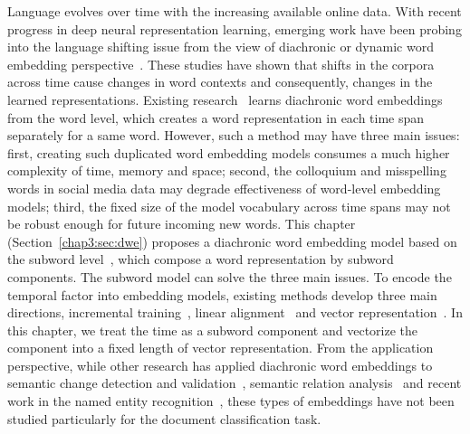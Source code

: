Language evolves over time with the increasing available online data. 
With recent progress in deep neural representation learning, emerging work have been probing into the language shifting issue from the view of diachronic or dynamic word embedding perspective~\cite{tang2018state, kutuzov2018diachronic}.
These studies have shown that shifts in the corpora across time cause changes in word contexts and consequently, changes in the learned representations. 
Existing research~\cite{kim2014temporal, hamilton2016diachronic, yao2018dynamic, kutuzov2018diachronic} learns diachronic word embeddings from the word level, which creates a word representation in each time span separately for a same word. However, such a method may have three main issues: first, creating such duplicated word embedding models consumes a much higher complexity of time, memory and space; second, the colloquium and misspelling words in social media data may degrade effectiveness of word-level embedding models; third, the fixed size of the model vocabulary across time spans may not be robust enough for future incoming new words.
This chapter (Section~\ref{chap3:sec:dwe}) proposes a diachronic word embedding model based on the subword level~\cite{huang2019neural}, which compose a word representation by subword components. The subword model can solve the three main issues.
To encode the temporal factor into embedding models, existing methods develop three main directions, incremental training~\cite{kim2014temporal}, linear alignment~\cite{kulkarni2015statistically, hamilton2016diachronic} and vector representation~\cite{rosenfeld2018deep, huang2019neural}.
In this chapter, we treat the time as a subword component and vectorize the component into a fixed length of vector representation.
From the application perspective, while other research has applied diachronic word embeddings to semantic change detection and validation~\cite{mihalcea2012word, kim2014temporal, kulkarni2015statistically, hamilton2016diachronic, dubossarsky2017outta, yao2018dynamic, rudolph2018dynamic, rosenfeld2018deep, hu2019diachronic}, semantic relation analysis~\cite{liao2016analysing, szymanski2017temporal, rosin2017learning} and recent work in the named entity recognition~\cite{rijhwani2020temporally}, these types of embeddings have not been studied particularly for the document classification task.

